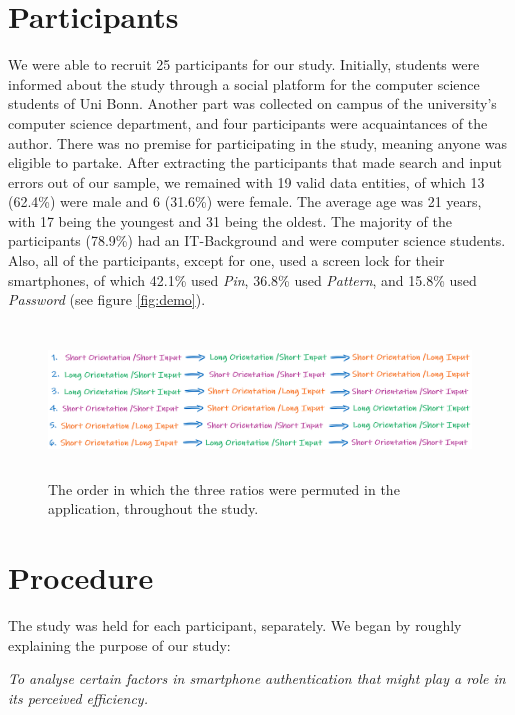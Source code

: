 \section{Participants} \label{5.2}

We were able to recruit 25 participants for our study. Initially, students were informed about the study through a social platform for the computer science students of Uni Bonn. Another part was collected on campus of the university's computer science department, and four participants were acquaintances of the author. There was no premise for participating in the study, meaning anyone was eligible to partake. After extracting the participants that made search and input errors out of our sample, we remained with 19 valid data entities, of which 13 (62.4\%) were male and 6 (31.6\%) were female. The average age was 21 years, with 17 being the youngest and 31 being the oldest. The majority of the participants (78.9\%) had an IT-Background and were computer science students. Also, all of the participants, except for one, used a screen lock for their smartphones, of which 42.1\% used \textit{Pin}, 36.8\% used \textit{Pattern}, and 15.8\% used \textit{Password} (see figure \ref{fig:demo}).  

\begin{figure}[t!]
\centering
\includegraphics[width=14cm, height=4cm]{Chapters/graphics/permutation.PNG}
\caption{The order in which the three ratios were permuted in the application, throughout the study.}
\label{fig:permutation}
\end{figure}


\section{Procedure} \label{5.3}
The study was held for each participant, separately. We began by roughly explaining the purpose of our study:

\begin{center}
\textit{To analyse certain factors in smartphone authentication that might play a role in its perceived efficiency.}    
\end{center}

